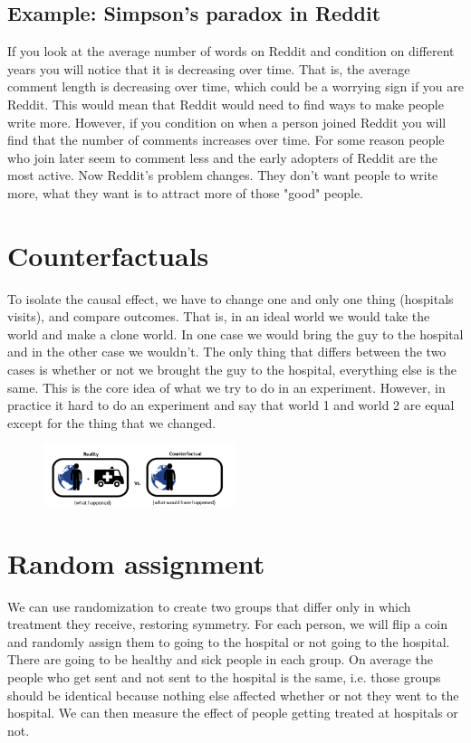 \subsection{Example: Simpson's paradox in Reddit}
If you look at the average number of words on Reddit and condition on different years you will notice that it is decreasing over time. That is, the average comment length is decreasing over time, which could be a worrying sign if you are Reddit. This would mean that Reddit would need to find ways to make people write more. However, if you condition on when a person joined Reddit you will find that the number of comments increases over time. For some reason people who join later seem to comment less and the early adopters of Reddit are the most active. Now Reddit's problem changes. They don't want people to write more, what they want is to attract more of those "good" people.

\section{Counterfactuals}
To isolate the causal effect, we have to change one and only one thing (hospitals visits), and compare outcomes. That is, in an ideal world we would take the world and make a clone world. In one case we would bring the guy to the hospital and in the other case we wouldn't. The only thing that differs between the two cases is whether or not we brought the guy to the hospital, everything else is the same. This is the core idea of what we try to do in an experiment. However, in practice it hard to do an experiment and say that world 1 and world 2 are equal except for the thing that we changed.

\begin{figure}[ht]
  \begin{center}
    \includegraphics[width=0.5\textwidth]{figures/counterfactuals.png}
  \end{center}
\end{figure}

\section{Random assignment}
We can use randomization to create two groups that differ only in which treatment they receive, restoring symmetry. For each person, we will flip a coin and randomly assign them to going to the hospital or not going to the hospital. There are going to be healthy and sick people in each group. On average the people who get sent and not sent to the hospital is the same, i.e. those groups should be identical because nothing else affected whether or not they went to the hospital. We can then measure the effect of people getting treated at hospitals or not. 

